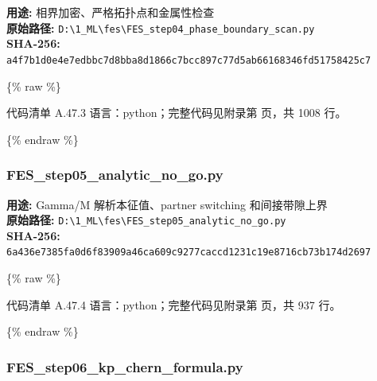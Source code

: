 \documentclass[lang=cn,scheme=chinese,color=blue,device=normal,toc=onecol,math=cm]{elegantbook}
\begin{document}
\textbf{用途:} 相界加密、严格拓扑点和金属性检查\\ \textbf{原始路径:} \texttt{D:\textbackslash{}\allowbreak{}1\_\allowbreak{}ML\textbackslash{}\allowbreak{}fes\textbackslash{}\allowbreak{}FES\_\allowbreak{}step04\_\allowbreak{}phase\_\allowbreak{}boundary\_\allowbreak{}scan.py}\\ \textbf{SHA-256:} \texttt{a4f7b1d0e4e7edbbc7d8bba8d1866c7bcc897c77d5ab66168346fd51758425c7}\par


\{\% raw \%\}\par


\begin{codeindexbox}{代码清单 A.47.3}
语言：python；完整代码见附录第 \pageref{code:47:3} 页，共 1008 行。
\end{codeindexbox}


\{\% endraw \%\}\par


\subsubsection{FES\_\allowbreak{}step05\_\allowbreak{}analytic\_\allowbreak{}no\_\allowbreak{}go.py}


\textbf{用途:} Gamma/\allowbreak{}M 解析本征值、partner switching 和间接带隙上界\\ \textbf{原始路径:} \texttt{D:\textbackslash{}\allowbreak{}1\_\allowbreak{}ML\textbackslash{}\allowbreak{}fes\textbackslash{}\allowbreak{}FES\_\allowbreak{}step05\_\allowbreak{}analytic\_\allowbreak{}no\_\allowbreak{}go.py}\\ \textbf{SHA-256:} \texttt{6a436e7385fa0d6f83909a46ca609c9277caccd1231c19e8716cb73b174d2697}\par


\{\% raw \%\}\par


\begin{codeindexbox}{代码清单 A.47.4}
语言：python；完整代码见附录第 \pageref{code:47:4} 页，共 937 行。
\end{codeindexbox}


\{\% endraw \%\}\par


\subsubsection{FES\_\allowbreak{}step06\_\allowbreak{}kp\_\allowbreak{}chern\_\allowbreak{}formula.py}
\end{document}
